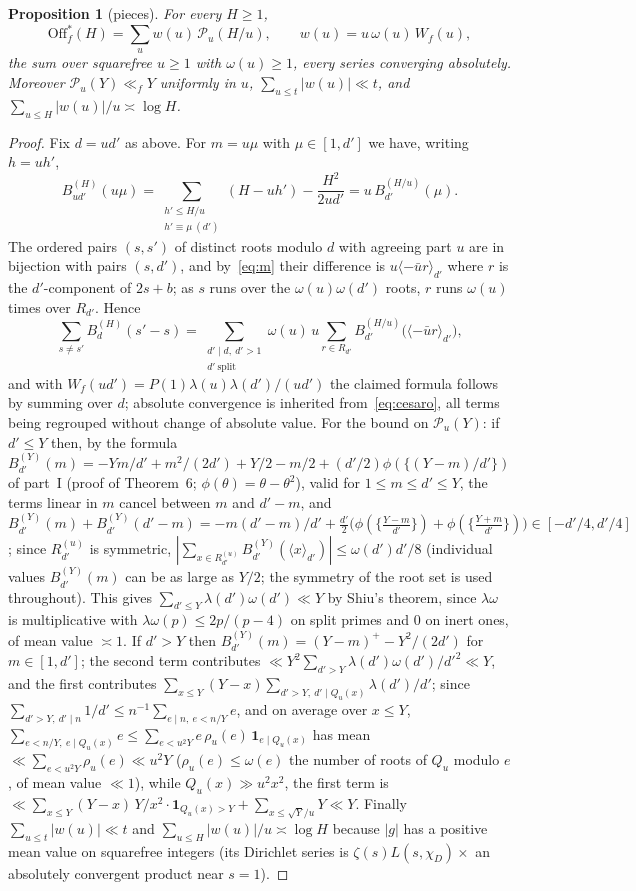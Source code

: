 \documentclass[11pt,a4paper]{article}
\newtheorem{proposition}[theorem]{Proposition}
\theoremstyle{remark}\newtheorem{remark}[theorem]{Remark}
\newcommand{\Off}{\mathrm{Off}}\newcommand{\e}{\mathrm{e}}
\newcommand{\rep}[2]{\langle #1\rangle_{#2}}
\begin{document}
\begin{proposition}[pieces]\label{prop:pieces}
For every $H\ge1$,
\[
\Off^\ast_f(H)=\sum_{u}w(u)\,\mathcal P_u(H/u),\qquad w(u)=u\,\omega(u)\,W_f(u),
\]
the sum over squarefree $u\ge1$ with $\omega(u)\ge1$, every series converging absolutely. Moreover
$\mathcal P_u(Y)\ll_fY$ uniformly in $u$, $\sum_{u\le t}|w(u)|\ll t$, and $\sum_{u\le H}|w(u)|/u\asymp\log H$.
\end{proposition}
\begin{proof}
Fix $d=ud'$ as above. For $m=u\mu$ with $\mu\in[1,d']$ we have, writing $h=uh'$,
\[
B^{(H)}_{ud'}(u\mu)=\sum_{\substack{h'\le H/u\\ h'\equiv\mu\ (d')}}(H-uh')-\frac{H^2}{2ud'}=u\,B^{(H/u)}_{d'}(\mu).
\]
The ordered pairs $(s,s')$ of distinct roots modulo $d$ with agreeing part $u$ are in bijection with pairs
$(s,d')$, and by~\eqref{eq:m} their difference is $u\rep{-\bar ur}{d'}$ where $r$ is the $d'$-component of $2s+b$;
as $s$ runs over the $\omega(u)\omega(d')$ roots, $r$ runs $\omega(u)$ times over $R_{d'}$. Hence
\[
\sum_{s\ne s'}B^{(H)}_d(s'-s)=\sum_{\substack{d'\mid d,\ d'>1\\ d'\ \mathrm{split}}}\omega(u)\,u\sum_{r\in R_{d'}}B^{(H/u)}_{d'}\bigl(\rep{-\bar ur}{d'}\bigr),
\]
and with $W_f(ud')=P(1)\lambda(u)\lambda(d')/(ud')$ the claimed formula follows by summing over $d$; absolute
convergence is inherited from~\eqref{eq:cesaro}, all terms being regrouped without change of absolute value.
For the bound on $\mathcal P_u(Y)$: if $d'\le Y$ then, by the formula
$B^{(Y)}_{d'}(m)=-Ym/d'+m^2/(2d')+Y/2-m/2+(d'/2)\phi(\{(Y-m)/d'\})$ of part~I (proof of Theorem~6; $\phi(\theta)=\theta-\theta^2$),
valid for $1\le m\le d'\le Y$, the terms linear in $m$ cancel between $m$ and $d'-m$, and
$B^{(Y)}_{d'}(m)+B^{(Y)}_{d'}(d'-m)=-m(d'-m)/d'+\tfrac{d'}2\bigl(\phi(\{\tfrac{Y-m}{d'}\})+\phi(\{\tfrac{Y+m}{d'}\})\bigr)\in[-d'/4,d'/4]$;
since $R^{(u)}_{d'}$ is symmetric, $|\sum_{x\in R^{(u)}_{d'}}B^{(Y)}_{d'}(\rep x{d'})|\le\omega(d')d'/8$ (individual values
$B^{(Y)}_{d'}(m)$ can be as large as $Y/2$; the symmetry of the root set is used throughout). This gives
$\sum_{d'\le Y}\lambda(d')\omega(d')\ll Y$ by Shiu's theorem, since $\lambda\omega$ is multiplicative with $\lambda\omega(p)\le2p/(p-4)$
on split primes and $0$ on inert ones, of mean value $\asymp1$. If $d'>Y$ then $B^{(Y)}_{d'}(m)=(Y-m)^+-Y^2/(2d')$
for $m\in[1,d']$; the second term contributes $\ll Y^2\sum_{d'>Y}\lambda(d')\omega(d')/d'^2\ll Y$, and the first
contributes $\sum_{x\le Y}(Y-x)\sum_{d'>Y,\ d'\mid Q_u(x)}\lambda(d')/d'$; since $\sum_{d'>Y,\ d'\mid n}1/d'\le n^{-1}\sum_{e\mid n,\ e<n/Y}e$,
and on average over $x\le Y$, $\sum_{e<n/Y,\ e\mid Q_u(x)}e\le\sum_{e<u^2Y}e\,\rho_u(e)\,\mathbf 1_{e\mid Q_u(x)}$ has
mean $\ll\sum_{e<u^2Y}\rho_u(e)\ll u^2Y$ ($\rho_u(e)\le\omega(e)$ the number of roots of $Q_u$ modulo $e$, of mean value
$\ll1$), while $Q_u(x)\gg u^2x^2$, the first term is $\ll\sum_{x\le Y}(Y-x)\,Y/x^2\cdot\mathbf 1_{Q_u(x)>Y}+\sum_{x\le\sqrt Y/u}Y\ll Y$.
Finally $\sum_{u\le t}|w(u)|\ll t$ and $\sum_{u\le H}|w(u)|/u\asymp\log H$ because $|g|$ has a positive mean value on squarefree
integers (its Dirichlet series is $\zeta(s)L(s,\chi_D)\times$ an absolutely convergent product near $s=1$).
\end{proof}
\end{document}
